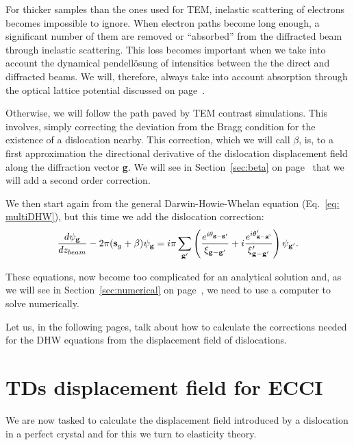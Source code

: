 For thicker samples than the ones used for TEM, inelastic scattering of electrons becomes impossible to ignore. When electron paths become long enough, a significant number of them are removed or ``absorbed'' from the diffracted beam through inelastic scattering. This loss becomes important when we take into account the dynamical pendell{\"o}sung of intensities between the the direct and diffracted beams. We will, therefore, always take into account absorption through the optical lattice potential discussed on page~\pageref{sec:absorbtion}.


Otherwise, we will follow the path paved by TEM contrast simulations. This involves, simply correcting the deviation from the Bragg condition for the existence of a dislocation nearby. This correction, which we will call $\beta$, is, to a first approximation the directional derivative of the dislocation displacement field along the diffraction vector \textbf{g}. We will see in Section~\ref{sec:beta} on page~\pageref{sec:beta} that we will add a second order correction.  

We then start again from the general Darwin-Howie-Whelan equation (Eq.~\ref{eq: multiDHW}), but this time we add the dislocation  correction:
\begin{equation}
\label{eq: multiDHWTD}
     \frac{d \psi_\mathbf{g}}{dz_{beam}} - 2 \pi  (\vb{s}_g+ \beta) \psi_{\vb{g}} = i \pi \sum_{\vb{g}'} \left( \frac{ e^{i \theta_{\textbf{g}- \textbf{g'}}}}{\xi_{\vb{g}-\vb{g}'}} +i\frac{ e^{i \theta'_{\textbf{g}- \textbf{g'}}}}{\xi'_{\vb{g}-\vb{g}'}}\right) \psi_{\vb{g}'}.
\end{equation}


These equations, now become too complicated for an analytical solution and, as we will see in Section~\ref{sec:numerical} on page~\pageref{sec:numerical},  we need to use a computer to solve numerically. 

Let us, in the following pages, talk about how to calculate the corrections needed for the DHW equations from the displacement field of dislocations. 


 \section{TDs displacement field for ECCI}
 \label{sec:strain}


We are now tasked to calculate the displacement field introduced by a dislocation in a perfect crystal and for this we turn to elasticity theory. 

